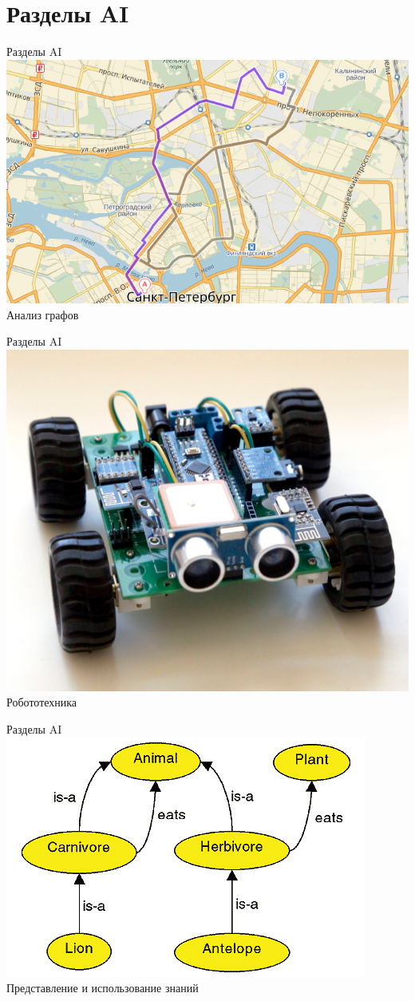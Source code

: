 \documentclass[10pt]{beamer}
\begin{document}
\section{Разделы AI}

\begin{frame}{Разделы AI}
  \centering
  \includegraphics[width=0.8 \linewidth, height=0.8 \textheight, keepaspectratio]{images/maps}\\
	Анализ графов
\end{frame}

\begin{frame}{Разделы AI}
  \centering
  \includegraphics[width=0.8 \linewidth, height=0.8 \textheight, keepaspectratio]{images/robot}\\
	Робототехника
\end{frame}

\begin{frame}{Разделы AI}
  \centering
  \includegraphics[width=0.8 \linewidth, height=0.8 \textheight, keepaspectratio]{images/ontology}\\
	Представление и использование знаний
\end{frame}
\end{document}
